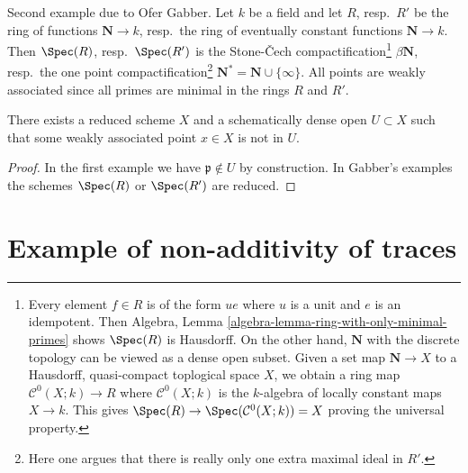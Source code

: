 \medskip\noindent
Second example due to Ofer Gabber. Let $k$ be a field and let
$R$, resp.\ $R'$ be the ring of functions $\mathbf{N} \to k$, resp.\ the ring
of eventually constant functions $\mathbf{N} \to k$. Then $\Spec(R)$,
resp.\ $\Spec(R')$ is the
Stone-{\v C}ech compactification\footnote{Every element $f \in R$ is of
the form $ue$ where $u$ is a unit and $e$ is an idempotent. Then
Algebra, Lemma \ref{algebra-lemma-ring-with-only-minimal-primes}
shows $\Spec(R)$ is Hausdorff. On the other hand, $\mathbf{N}$ with the
discrete topology can be viewed as a dense open subset. Given a set map
$\mathbf{N} \to X$ to a Hausdorff, quasi-compact toplogical space $X$,
we obtain a ring map $\mathcal{C}^0(X; k) \to R$ where $\mathcal{C}^0(X; k)$
is the $k$-algebra of locally constant maps $X \to k$. This gives
$\Spec(R) \to \Spec(\mathcal{C}^0(X; k)) = X$ proving the universal
property.} $\beta\mathbf{N}$, resp.\ the
one point compactification\footnote{Here one argues that there is really
only one extra maximal ideal in $R'$.}
$\mathbf{N}^* = \mathbf{N} \cup \{\infty\}$.
All points are weakly associated since all primes are minimal in the
rings $R$ and $R'$.

\begin{lemma}
\label{lemma-example-schematically-dense-missing-weakly-associated-point}
There exists a reduced scheme $X$ and a schematically dense open
$U \subset X$ such that some weakly associated point $x \in X$ is not in $U$.
\end{lemma}

\begin{proof}
In the first example we have $\mathfrak p \not \in U$ by construction.
In Gabber's examples the schemes $\Spec(R)$ or $\Spec(R')$ are reduced.
\end{proof}



\section{Example of non-additivity of traces}
\label{section-non-additive}


